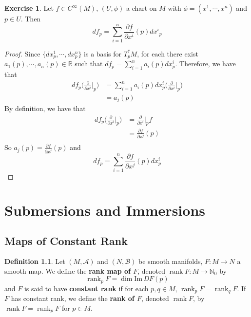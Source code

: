 \documentclass{book}
\theoremstyle{definition}
\newtheorem{defn}[definition]{Definition}
\newtheorem{ex}[definition]{Exercise}
\newcommand{\N}{\mathbb{N}}
\newcommand{\R}{\mathbb{R}}
\newcommand{\MA}{\mathcal{A}}
\newcommand{\MB}{\mathcal{B}}
\DeclareMathOperator{\rnk}{rank}
\DeclareMathOperator*{\0}{\mbf{0}}
\DeclareMathOperator*{\1}{\mbf{1}}
\renewcommand{\Im}{\text{Im} \,}
\newcommand{\tbf}[1]{\textbf{#1}}
\newcommand{\p}{\partial}
\begin{document}
	\begin{ex}
		Let $f \in C^{\infty}(M)$, $(U, \phi)$ a chart on $M$ with $\phi = (x^1, \cdots, x^n)$ and $p \in U$. Then $$df_p = \sum_{i=1}^n \frac{\p f}{\p x^i}(p) {dx^i}_p$$
	\end{ex}

	\begin{proof}
		 Since $\{dx^1_p, \cdots, dx^n_p\}$ is a basis for $T^*_pM$, for each there exist $a_1(p), \cdots, a_n(p) \in \R$ such that $df_p = \sum\limits_{i=1}^n a_i(p)dx^i_p$. Therefore, we have that 
		\begin{align*}
			df_p \bigg(\frac{\p}{\p x^i} \bigg|_p \bigg) 
			&= \sum\limits_{i=1}^n a_i(p)dx^i_p \bigg(\frac{\p}{\p x^i} \bigg|_p \bigg)  \\
			&=  a_j(p)
		\end{align*}
		By definition, we have that 
		\begin{align*}
			df_p\bigg(\frac{\p}{\p x^i} \bigg|_p \bigg) 
			&= \frac{\p}{\p x^i} \bigg|_p f \\ 
			&= \frac{\p f}{\p x^j}(p)\\
		\end{align*}
		So $a_j(p) = \frac{\p f}{\p x^j} (p)$ and $$df_p = \sum\limits_{i=1}^n \frac{\p f}{\p x^j} (p)dx^i_p$$
	\end{proof}
		
	
	
	
	
	
	
	
	
	
	
	
	
	
	
	
	
	
	
	\newpage
	\chapter{Submersions and Immersions}
	
	\section{Maps of Constant Rank}
	
	\begin{defn}
		Let $(M, \MA)$ and $(N, \MB)$ be smooth manifolds, $F: M \rightarrow N$ a smooth map. We define the \tbf{rank map of $F$}, denoted $\rnk F: M \rightarrow \N_0$ by 
		$$\rnk_p F = \dim \Im D F(p)$$
		and $F$ is said to have  \tbf{constant rank} if for each $p, q \in M$, $\rnk_p F = \rnk_q F$. If $F$ has constant rank, we define the \tbf{rank of $F$}, denoted $\rnk F$, by $\rnk F = \rnk_p F$ for $p \in M$.
	\end{defn}
\end{document}
